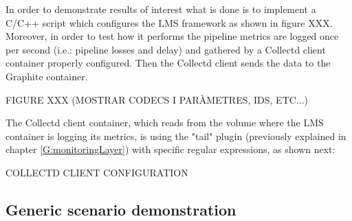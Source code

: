 In order to demonstrate results of interest what is done is to implement a C/C++ script which configures the LMS framework as shown in figure XXX. Moreover, in order to test how it performs the pipeline metrics are logged once per second (i.e.: pipeline losses and delay) and gathered by a Collectd client container properly configured. Then the Collectd client sends the data to the Graphite container. 

FIGURE XXX (MOSTRAR CODECS I PARÀMETRES, IDS, ETC...)

The Collectd client container, which reads from the volume where the LMS container is logging its metrics, is using the "tail" plugin (previously explained in chapter \ref{G:monitoringLayer}) with specific regular expressions, as shown next:

COLLECTD CLIENT CONFIGURATION




\subsection{Generic scenario demonstration}

